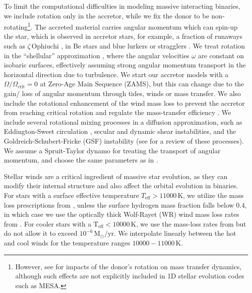 \documentclass[linenumbers,trackchanges,twocolumn]{aastex701}
\newcommand{\Mdot}{\mathrm{M}_{\odot}}
\begin{document}
To limit the computational difficulties in modeling massive
interacting binaries, we include rotation only in the accretor, while
we fix the donor to be non-rotating\footnote{However, see \cite{2023MNRAS.524.4315H} for impacts of the donor's rotation on mass transfer dynamics, although such effects are not explicitly included in 1D stellar evolution codes such as \textsc{MESA}.}. The accreted material carries
angular momentum which can spin-up the star, which is observed in
accretor stars, for example, a fraction of runaways
\citep{1993ASPC...35..207B} such as $\zeta\, \mathrm{Ophiuchi}$
\citep{2018AN....339...46Z, 2021ApJ...923..277R}, in Be stars
\citep{2026enap....2..430R} and blue lurkers or stragglers
\citep{2019ApJ...881...47L}. We treat rotation in the ``shellular''
approximation \citep{1992A&A...265..115Z,2012A&A...537A.146E}, where
the angular velocities $\omega$ are constant on isobaric surfaces,
effectively assuming strong angular momentum transport in the
horizontal direction due to turbulence. We start our accretor models
with a $\Omega/\Omega_{\mathrm{crit}} = 0$ at Zero-Age Main Sequence
(ZAMS), but this can change due to the gain/ loss of angular momentum through tides, winds or mass transfer. We also include the rotational
enhancement of the wind mass loss \citep{1998A&A...329..551L} to prevent the accretor from reaching critical rotation and regulate the
mass-transfer efficiency \cite[see below and also][]{2025ApJ...990L..51L, 2025arXiv251115347S, 2026arXiv260206259X}. We include several
rotational mixing processes in a diffusion approximation, such as
Eddington-Sweet circulation \citep{1950MNRAS.110..548S}, secular and
dynamic shear instabilities, and the Goldreich-Schubert-Fricke (GSF)
instability (see \citealp{2000ApJ...528..368H} for a review of these
processes). We assume a Spruit-Taylor dynamo
\citep{2002A&A...381..923S} for treating the transport of angular
momentum, and choose the same parameters as in
\cite{2000ApJ...528..368H}.

Stellar winds are a critical ingredient of massive star evolution, as they can modify their internal structure \citep[e.g.,][]{2017A&A...603A.118R, 2026arXiv260102263R} and also affect the orbital evolution in binaries. For stars with a surface effective temperature $T_\mathrm{{eff}} > 11000\,\mathrm{K}$, we utilize the mass loss prescriptions from \cite{2023A&A...676A.109B}, unless the surface hydrogen mass fraction falls below $0.4$, in which case we use the optically thick Wolf-Rayet (WR) wind mass loss rates from \cite{2000A&A...360..227N}. For cooler stars with a $\mathrm{T_{eff}} < 10000\,\mathrm{K}$, we use the mass-loss rates from \cite{2024A&A...681A..17D} but do not allow it to exceed $10^{-6}\,\Mdot/\mathrm{yr}$. We interpolate linearly between the hot and cool winds for the temperature ranges $10000-11000\,\mathrm{K}$.
\end{document}
